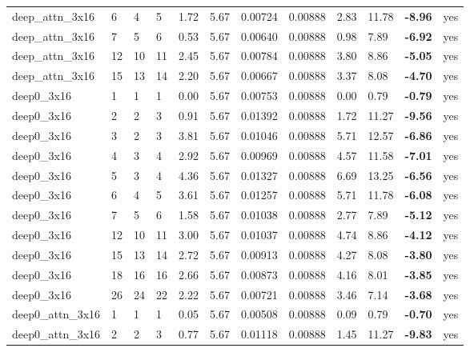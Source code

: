 \documentclass[10pt,a4paper]{article}
\begin{document}
\begin{landscape}
\begin{footnotesize}
\begin{longtable}{llllllllllll}
deep\_attn\_3x16 & 6 & 4 & 5 & 1.72 & 5.67 & 0.00724 & 0.00888 & 2.83 & 11.78 & \textbf{-8.96} & yes \\
deep\_attn\_3x16 & 7 & 5 & 6 & 0.53 & 5.67 & 0.00640 & 0.00888 & 0.98 & 7.89 & \textbf{-6.92} & yes \\
deep\_attn\_3x16 & 12 & 10 & 11 & 2.45 & 5.67 & 0.00784 & 0.00888 & 3.80 & 8.86 & \textbf{-5.05} & yes \\
deep\_attn\_3x16 & 15 & 13 & 14 & 2.20 & 5.67 & 0.00667 & 0.00888 & 3.37 & 8.08 & \textbf{-4.70} & yes \\
deep0\_3x16 & 1 & 1 & 1 & 0.00 & 5.67 & 0.00753 & 0.00888 & 0.00 & 0.79 & \textbf{-0.79} & yes \\
deep0\_3x16 & 2 & 2 & 3 & 0.91 & 5.67 & 0.01392 & 0.00888 & 1.72 & 11.27 & \textbf{-9.56} & yes \\
deep0\_3x16 & 3 & 2 & 3 & 3.81 & 5.67 & 0.01046 & 0.00888 & 5.71 & 12.57 & \textbf{-6.86} & yes \\
deep0\_3x16 & 4 & 3 & 4 & 2.92 & 5.67 & 0.00969 & 0.00888 & 4.57 & 11.58 & \textbf{-7.01} & yes \\
deep0\_3x16 & 5 & 3 & 4 & 4.36 & 5.67 & 0.01327 & 0.00888 & 6.69 & 13.25 & \textbf{-6.56} & yes \\
deep0\_3x16 & 6 & 4 & 5 & 3.61 & 5.67 & 0.01257 & 0.00888 & 5.71 & 11.78 & \textbf{-6.08} & yes \\
deep0\_3x16 & 7 & 5 & 6 & 1.58 & 5.67 & 0.01038 & 0.00888 & 2.77 & 7.89 & \textbf{-5.12} & yes \\
deep0\_3x16 & 12 & 10 & 11 & 3.00 & 5.67 & 0.01037 & 0.00888 & 4.74 & 8.86 & \textbf{-4.12} & yes \\
deep0\_3x16 & 15 & 13 & 14 & 2.72 & 5.67 & 0.00913 & 0.00888 & 4.27 & 8.08 & \textbf{-3.80} & yes \\
deep0\_3x16 & 18 & 16 & 16 & 2.66 & 5.67 & 0.00873 & 0.00888 & 4.16 & 8.01 & \textbf{-3.85} & yes \\
deep0\_3x16 & 26 & 24 & 22 & 2.22 & 5.67 & 0.00721 & 0.00888 & 3.46 & 7.14 & \textbf{-3.68} & yes \\
deep0\_attn\_3x16 & 1 & 1 & 1 & 0.05 & 5.67 & 0.00508 & 0.00888 & 0.09 & 0.79 & \textbf{-0.70} & yes \\
deep0\_attn\_3x16 & 2 & 2 & 3 & 0.77 & 5.67 & 0.01118 & 0.00888 & 1.45 & 11.27 & \textbf{-9.83} & yes \\
\bottomrule \end{longtable}
\end{footnotesize}
\end{landscape}
\end{document}
